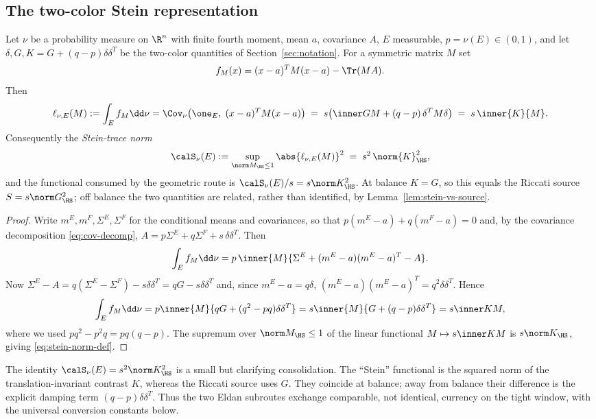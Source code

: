 \documentclass[../../main.tex]{subfiles}
\begin{document}
\subsection{The two-color Stein representation}

\begin{proposition}
\label{prop:stein-rep}
Let $\nu$ be a probability measure on $\R^n$ with finite fourth moment, mean $a$, covariance $A$,
$E$ measurable, $p=\nu(E)\in(0,1)$, and let $\delta,G,K=G+(q-p)\delta\delta^T$ be the two-color
quantities of Section~\ref{sec:notation}. For a symmetric matrix $M$ set
\[
  f_M(x)=(x-a)^TM(x-a)-\Tr(MA).
\]
Then
\begin{equation}\label{eq:stein-rep}
  \ell_{\nu,E}(M):=\int_E f_M\dd\nu
  =\Cov_\nu\bigl(\one_E,\;(x-a)^TM(x-a)\bigr)
  \;=\;s\bigl(\inner GM+(q-p)\,\delta^TM\delta\bigr)
  \;=\;s\,\inner{K}{M}.
\end{equation}
Consequently the \emph{Stein-trace norm}
\begin{equation}\label{eq:stein-norm-def}
  \calS_\nu(E):=\sup_{\norm M_\HS\le1}\abs{\ell_{\nu,E}(M)}^2
  \;=\;s^2\,\norm{K}_\HS^2 ,
\end{equation}
and the functional consumed by the geometric route is
    $\calS_\nu(E)/s=s\norm K_\HS^2$. At balance $K=G$, so this equals the Riccati source
$S=s\norm G_\HS^2$; off balance the two quantities are related, rather than identified, by
Lemma~\ref{lem:stein-vs-source}.
\end{proposition}

\begin{proof}
Write $m^E,m^F,\Sigma^E,\Sigma^F$ for the conditional means and covariances, so that
$p(m^E-a)+q(m^F-a)=0$ and, by the covariance decomposition \eqref{eq:cov-decomp},
$A=p\Sigma^E+q\Sigma^F+s\,\delta\delta^T$. Then
\[
  \int_E f_M\dd\nu
  =p\,\inner{M}{\Sigma^E+(m^E-a)(m^E-a)^T-A} .
\]
Now $\Sigma^E-A=q(\Sigma^E-\Sigma^F)-s\delta\delta^T=qG-s\delta\delta^T$ and, since
$m^E-a=q\delta$, $(m^E-a)(m^E-a)^T=q^2\delta\delta^T$. Hence
\[
  \int_E f_M\dd\nu
  =p\inner{M}{qG+(q^2-pq)\delta\delta^T}
  =s\inner{M}{G+(q-p)\delta\delta^T}=s\inner KM ,
\]
where we used $pq^2-p^2q=pq(q-p)$. The supremum over $\norm M_\HS\le1$ of the linear functional
$M\mapsto s\inner KM$ is $s\norm K_\HS$, giving \eqref{eq:stein-norm-def}.
\end{proof}

\begin{remark}
The identity $\calS_\nu(E)=s^2\norm K_\HS^2$ is a small but clarifying consolidation. The
``Stein'' functional is the squared norm of the translation-invariant contrast $K$, whereas the
Riccati source uses $G$. They coincide at balance; away from balance their difference is the
explicit damping term $(q-p)\delta\delta^T$. Thus the two Eldan subroutes exchange comparable,
not identical, currency on the tight window, with the universal conversion constants below.
\end{remark}
\end{document}
